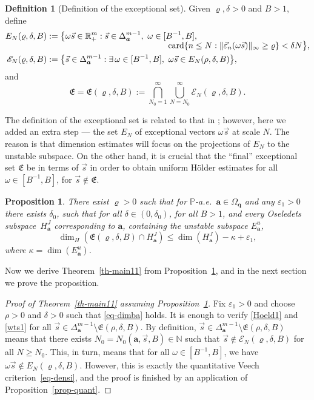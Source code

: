 \documentclass[JEP,XML,SOM,Unicode]{cedram}
\let\mathcal\mathscr
\newcommand{\sep}{:}
\let\epsilon\varepsilon
\theoremstyle{plain}
\newtheorem{prop}[theorem]{Proposition}
\theoremstyle{definition}
\newtheorem{defi}[theorem]{Definition}
\DeclareMathOperator{\card}{card}
\newcommand\bom{{\boldsymbol a}}\let\ba\bom
\newcommand\bq{{\boldsymbol q}}
\let\eps\varepsilon
\let\om\omega
\let\Om\Omega
\newcommand\Fre{\mathfrak{E}}
\newcommand{\Ek}{\mathcal{E}}
\newcommand{\R}{\mathbb{R}}
\newcommand{\N}{\mathbb{N}}
\renewcommand{\P}{\mathbb{P}}
\newcommand\be{\begin{equation}}
\newcommand\ee{\end{equation}}
\begin{document}
\begin{defi}[Definition of the exceptional set]
Given $\varrho,\delta>0$ and $B>1$, define
\begin{align*}
E_N(\varrho,\delta,B) &:=\bigl\{\om\vec{s}\in \R^m_+\sep \vec s\in \Delta_\bom^{m-1},\ \om\in [B^{-1},B],\\[-5pt]
&\hspace*{5cm}\card\{n\le N: \|\vec\eps_{n}(\om\vec s)\|_\infty\ge \varrho\} < \delta N\bigr\},\\
\Ek_N(\varrho,\delta,B)&:= \bigl\{\vec s\in \Delta_\bom^{m-1}\sep \exists\,\om\in [B^{-1},B],\ \om\vec s\in E_N(\rho,\delta,B)\bigr\},
\end{align*}
and
\be \label{def-excep}
\Fre=\Fre(\varrho,\delta,B):= \bigcap_{N_0=1}^\infty \bigcup_{N=N_0}^\infty \Ek_N(\varrho,\delta,B).
\ee
\end{defi}

The definition of the exceptional set is related to that in \cite[\S9]{BuSo18a}; however, here we added an extra step --- the set $E_N$ of exceptional vectors $\om\vec s$ at scale $N$. The reason is that dimension estimates will focus on the projections of $E_N$ to the unstable subspace. On the other hand, it is crucial that the ``final'' exceptional set $\Fre$ be in terms of $\vec s$ in order to obtain uniform Hölder estimates for all $\om\in [B^{-1},B]$, for $\vec s\not\in \Fre$.

\begin{prop} \label{prop-EK}
There exist $\varrho>0$ such that for $\P$-a.e.\ $\bom\in \Om_\bq$ and any $\epsilon_1>0$ there exists $\delta_0$, such that for all $\delta\in (0,\delta_0)$, for all $B>1$, and every
Oseledets subspace~$H_\bom^J$ corresponding to $\bom$, containing the unstable subspace $E^u_\bom$,
\be \label{eq-dimba}
\dim_H(\Fre(\varrho,\delta,B)\cap H_\bom^J) \le \dim(H_\bom^J) -\kappa + \epsilon_1,
\ee
where $\kappa=\dim(E^u_\bom)$.
\end{prop}

Now we derive Theorem~\ref{th-main11} from Proposition~\ref{prop-EK}, and in the next section we prove the proposition.

\begin{proof}[Proof of Theorem~\ref{th-main11} assuming Proposition~\ref{prop-EK}] Fix $\epsilon_1\!>\!0$ and choose $\rho\!>\!0$ and $\delta\!>\!0$ such that \eqref{eq-dimba} holds.
It is enough to verify \eqref{Hoeld1} and \eqref{wts1} for all $\vec s\in \Delta_\bom^{m-1}\setminus \Fre(\rho,\delta,B)$. By definition, $\vec{s} \in \Delta_{\bom}^{m-1}\setminus \Fre(\rho,\delta,B)$ means that there exists $N_0=N_0(\bom,\vec s, B)\in \N$ such that $\vec s\!\not\in\!\Ek_N(\varrho,\delta,B)$ for all $N\!\ge\!N_0$.
This, in turn, means that for all \hbox{$\om\in[B^{-1},B]$}, we have $\om\vec s\not \in E_N(\varrho,\delta,B)$. However, this is exactly the quantitative Veech criterion~\eqref{eq-densi}, and the proof is finished
by an application of Proposition~\ref{prop-quant}.
\end{proof}
\end{document}
